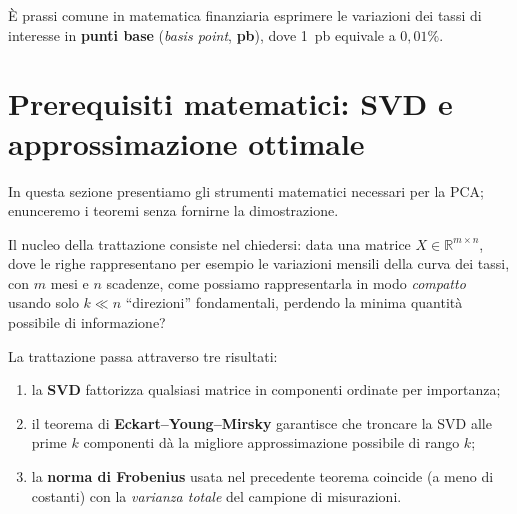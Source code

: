 \documentclass[11pt,a4paper]{article}
\theoremstyle{plain}
\theoremstyle{definition}
\theoremstyle{remark}
\begin{document}

È prassi comune in matematica finanziaria esprimere le variazioni dei tassi di
interesse in \textbf{punti base} (\emph{basis point}, \textbf{pb}), dove 1~pb
equivale a $0{,}01\%$.



\section{Prerequisiti matematici: SVD e approssimazione ottimale}

In questa sezione presentiamo gli strumenti matematici necessari per la PCA;
enunceremo i teoremi senza fornirne la dimostrazione.

Il nucleo della trattazione consiste nel chiedersi: data una matrice
$X \in \mathbb{R}^{m \times n}$, dove le righe rappresentano per esempio le variazioni mensili della curva dei
tassi, con $m$ mesi e $n$ scadenze, come possiamo rappresentarla in modo
\emph{compatto} usando solo $k \ll n$ ``direzioni'' fondamentali, perdendo
la minima quantità possibile di informazione?


La trattazione passa attraverso tre risultati:
\begin{enumerate}
  \item la \textbf{SVD} fattorizza qualsiasi matrice in componenti ordinate
        per importanza;
  \item il teorema di \textbf{Eckart--Young--Mirsky} garantisce che troncare
        la SVD alle prime $k$ componenti dà la migliore approssimazione
        possibile di rango $k$;
  \item la \textbf{norma di Frobenius} usata nel precedente teorema coincide
        (a meno di costanti) con la \emph{varianza totale} del campione di misurazioni.
\end{enumerate}
\end{document}

